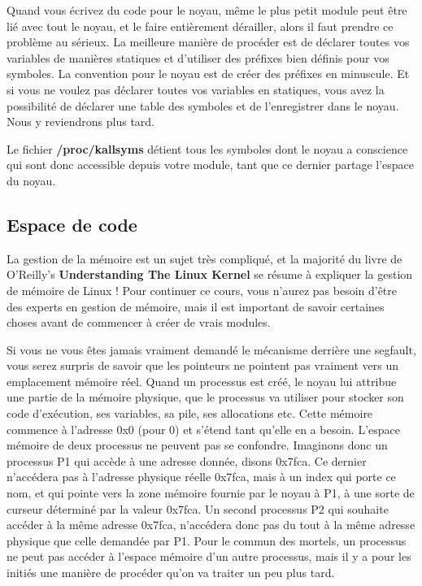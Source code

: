 \documentclass[11pt]{article}
\begin{document}
Quand vous écrivez du code pour le noyau, même le plus petit module peut être lié avec tout le noyau, et le faire entièrement dérailler, alors il faut prendre ce problème au sérieux. La meilleure manière de procéder est de déclarer toutes vos variables de manières statiques et d'utiliser des préfixes bien définis pour vos symboles. La convention pour le noyau est de créer des préfixes en minuscule. Et si vous ne voulez pas déclarer toutes vos variables en statiques, vous avez la possibilité de déclarer une table des symboles et de l'enregistrer dans le noyau. Nous y reviendrons plus tard.

Le fichier \textbf{/proc/kallsyms} détient tous les symboles dont le noyau a conscience qui sont donc accessible depuis votre module, tant que ce dernier partage l'espace du noyau.

\subsection*{Espace de code}
\label{sec-5-5}

La gestion de la mémoire est un sujet très compliqué, et la majorité du livre de O'Reilly's \textbf{Understanding The Linux Kernel} se résume à expliquer la gestion de mémoire de Linux ! Pour continuer ce cours, vous n'aurez pas besoin d'être des experts en gestion de mémoire, mais il est important de savoir certaines choses avant de commencer à créer de vrais modules.

Si vous ne vous êtes jamais vraiment demandé le mécanisme derrière une segfault, vous serez surpris de savoir que les pointeurs ne pointent pas vraiment vers un emplacement mémoire réel. Quand un processus est créé, le noyau lui attribue une partie de la mémoire physique, que le processus va utiliser pour stocker son code d'exécution, ses variables, sa pile, ses allocations etc. Cette mémoire commence à l'adresse 0x0 (pour 0) et s'étend tant qu'elle en a besoin. L'espace mémoire de deux processus ne peuvent pas se confondre. Imaginons donc un processus P1 qui accède à une adresse donnée, disons 0x7fca. Ce dernier n'accédera pas à l'adresse physique réelle 0x7fca, mais à un index qui porte ce nom, et qui pointe vers la zone mémoire fournie par le noyau à P1, à une sorte de curseur déterminé par la valeur 0x7fca. Un second processus P2 qui souhaite accéder à la même adresse 0x7fca, n'accédera donc pas du tout à la même adresse physique que celle demandée par P1. Pour le commun des mortels, un processus ne peut pas accéder à l'espace mémoire d'un autre processus, mais il y a pour les initiés une manière de procéder qu'on va traiter un peu plus tard.
\end{document}
